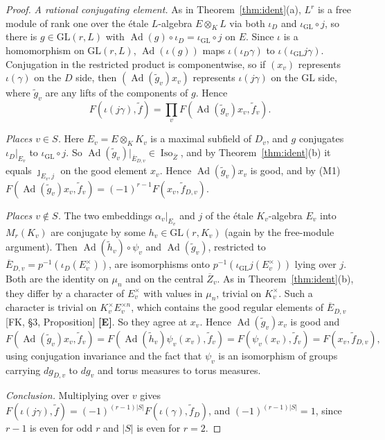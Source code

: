 \documentclass[12pt]{article}
\newcommand{\ov}[1]{\overline{#1}}
\newcommand{\Ad}{\operatorname{Ad}}
\newcommand{\Iso}{\operatorname{Iso}}
\newcommand{\GL}{\mathrm{GL}}
\newcommand{\Zb}{\ov{Z}}
\newcommand{\Eb}{\ov{E}}
\newcommand{\iD}{\iota_D}
\newcommand{\iG}{\iota_{\GL}}
\newcommand{\jj}{\jmath}
\newcommand{\Ev}{\textbf{[E]}}
\theoremstyle{plain}
\theoremstyle{definition}
\begin{document}
\begin{proof}
\emph{A rational conjugating element.} As in Theorem~\ref{thm:ident}(a), $L^r$ is a free module of rank one over the \'etale $L$-algebra $E\otimes_KL$ via both $\iD$ and $\iG\circ j$, so there is $g\in\GL(r,L)$ with $\Ad(g)\circ\iD=\iG\circ j$ on $E$. Since $\iota$ is a homomorphism on $\GL(r,L)$, $\Ad(\iota(g))$ maps $\iota(\iD\gamma)$ to $\iota(\iG j\gamma)$. Conjugation in the restricted product is componentwise, so if $(x_v)$ represents $\iota(\gamma)$ on the $D$ side, then $(\Ad(\tilde g_v)x_v)$ represents $\iota(j\gamma)$ on the $\GL$ side, where $\tilde g_v$ are any lifts of the components of $g$. Hence
\[ F(\iota(j\gamma),\tilde f)=\prod_vF(\Ad(\tilde g_v)x_v,\tilde f_v). \]

\emph{Places $v\in S$.} Here $E_v=E\otimes_KK_v$ is a maximal subfield of $D_v$, and $g$ conjugates $\iD|_{E_v}$ to $\iG\circ j$. So $\Ad(\tilde g_v)|_{\Eb_{D,v}}\in\Iso_{\Zb}$, and by Theorem~\ref{thm:ident}(b) it equals $\jj_{E_v,j}$ on the good element $x_v$. Hence $\Ad(\tilde g_v)x_v$ is good, and by (M1) $F(\Ad(\tilde g_v)x_v,\tilde f_v)=(-1)^{r-1}F(x_v,\tilde f_{D,v})$.

\emph{Places $v\notin S$.} The two embeddings $\alpha_v|_{E_v}$ and $j$ of the \'etale $K_v$-algebra $E_v$ into $M_r(K_v)$ are conjugate by some $h_v\in\GL(r,K_v)$ (again by the free-module argument). Then $\Ad(\tilde h_v)\circ\psi_v$ and $\Ad(\tilde g_v)$, restricted to $\Eb_{D,v}=p^{-1}(\iD(E_v^\times))$, are isomorphisms onto $p^{-1}(\iG j(E_v^\times))$ lying over $j$. Both are the identity on $\mu_n$ and on the central $\Zb_v$. As in Theorem~\ref{thm:ident}(b), they differ by a character of $E_v^\times$ with values in $\mu_n$, trivial on $K_v^\times$. Such a character is trivial on $K_v^\times E_v^{\times n}$, which contains the good regular elements of $\Eb_{D,v}$ [FK, \S3, Proposition] \Ev. So they agree at $x_v$. Hence $\Ad(\tilde g_v)x_v$ is good and
\[ F(\Ad(\tilde g_v)x_v,\tilde f_v)=F(\Ad(\tilde h_v)\psi_v(x_v),\tilde f_v)=F(\psi_v(x_v),\tilde f_v)=F(x_v,\tilde f_{D,v}), \]
using conjugation invariance and the fact that $\psi_v$ is an isomorphism of groups carrying $dg_{D,v}$ to $dg_v$ and torus measures to torus measures.

\emph{Conclusion.} Multiplying over $v$ gives $F(\iota(j\gamma),\tilde f)=(-1)^{(r-1)|S|}F(\iota(\gamma),\tilde f_D)$, and $(-1)^{(r-1)|S|}=1$, since $r-1$ is even for odd $r$ and $|S|$ is even for $r=2$.
\end{proof}
\end{document}
